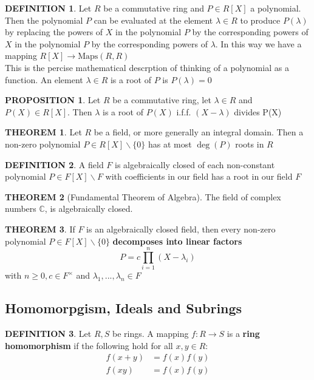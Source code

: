 \documentclass[12pt]{article}
\theoremstyle{definition}
\newtheorem{definition}{DEFINITION}[subsection]
\newtheorem{theorem}{THEOREM}[subsection]
\newcommand{\Maps}{\text{Maps}}
\newtheorem{prop}{PROPOSITION}[subsection]
\begin{document}
\begin{definition}
    Let $R$ be a commutative ring and $P\in R[X]$ a polynomial. Then the polynomial $P$ can be evaluated at the element $\lambda \in R$ to produce $P(\lambda)$ by replacing the powers of $X$ in the polynomial $P$ by the corresponding powers of $X$ in the polynomial $P$ by the corresponding powers of $\lambda$. In this way we have a mapping $R[X]\rightarrow\Maps(R,R)$\\This is the percise mathematical descrption of thinking of a polynomial as a function. An element $\lambda \in R$ is a root of $P$ is $P(\lambda) = 0$
\end{definition}

\begin{prop}
    Let $R$ be a commutative ring, let $\lambda \in R$ and $P(X) \in R[X]$. Then $\lambda$ is a root of $P(X)$ i.f.f. $(X - \lambda)$ divides P(X) 
\end{prop}

\begin{theorem}
    Let $R$ be a field, or more generally an integral domain. Then a non-zero polynomial $P \in R[X]\backslash\{0\}$ has at most $\deg(P)$ roots in $R$
\end{theorem}

\begin{definition}
    A field $F$ is algebraically closed of each non-constant polynomial $P \in F[X]\backslash F$ with coefficients in our field has a root in our field $F$
\end{definition}

\begin{theorem}[Fundamental Theorem of Algebra]
    The field of complex numbers $\mathbb{C}$, is algebraically closed.
\end{theorem}

\begin{theorem}
    If $F$ is an algebraically closed field, then every non-zero polynomial $P\in F[X]\backslash\{0\}$ \textbf{decomposes into linear factors}
    $$P = c\prod_{i=1}^n{(X-\lambda_i)}$$
    with $n \geq 0, c\in F^\times$ and $\lambda_1,...,\lambda_n\in F$
\end{theorem}

\subsection{Homomorpgism, Ideals and Subrings}
\begin{definition}
    Let $R,S$ be rings. A mapping $f:R\rightarrow S$ is a \textbf{ring homomorphism} if the following hold for all $x,y \in R$:
    \[\begin{split}
        f(x+y) &= f(x)f(y)\\
        f(xy) &= f(x)f(y)
    \end{split}\]
\end{definition}
\end{document}
